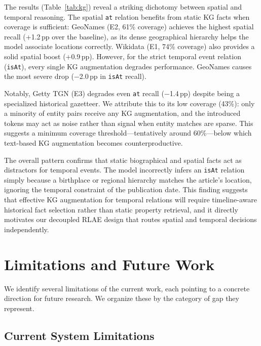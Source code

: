 \documentclass[11pt,a4paper]{article}
\begin{document}
The results (Table~\ref{tab:kg}) reveal a striking dichotomy between spatial and temporal reasoning. The spatial \texttt{at} relation benefits from static KG facts when coverage is sufficient: GeoNames (E2, 61\% coverage) achieves the highest spatial recall (+1.2\,pp over the baseline), as its dense geographical hierarchy helps the model associate locations correctly. Wikidata (E1, 74\% coverage) also provides a solid spatial boost (+0.9\,pp). However, for the strict temporal event relation (\texttt{isAt}), every single KG augmentation degrades performance. GeoNames causes the most severe drop ($-$2.0\,pp in \texttt{isAt} recall).

Notably, Getty TGN (E3) degrades even \texttt{at} recall ($-$1.4\,pp) despite being a specialized historical gazetteer. We attribute this to its low coverage (43\%): only a minority of entity pairs receive any KG augmentation, and the introduced tokens may act as noise rather than signal when entity matches are sparse. This suggests a minimum coverage threshold---tentatively around 60\%---below which text-based KG augmentation becomes counterproductive.

The overall pattern confirms that static biographical and spatial facts act as distractors for temporal events. The model incorrectly infers an \texttt{isAt} relation simply because a birthplace or regional hierarchy matches the article's location, ignoring the temporal constraint of the publication date. This finding suggests that effective KG augmentation for temporal relations will require timeline-aware historical fact selection rather than static property retrieval, and it directly motivates our decoupled RLAE design that routes spatial and temporal decisions independently.

\section{Limitations and Future Work}
\label{sec:limitations}

We identify several limitations of the current work, each pointing to a concrete direction for future research. We organize these by the category of gap they represent.

\subsection*{Current System Limitations}
\end{document}
